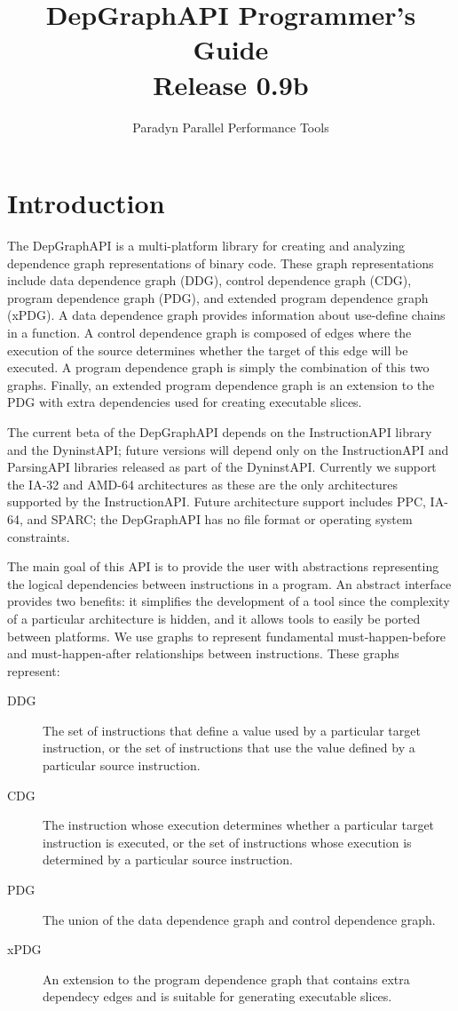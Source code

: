 \documentclass[12pt,titlepage]{article}
\begin{document}
\title{DepGraphAPI Programmer's Guide \\ Release 0.9b}
\author{Paradyn Parallel Performance Tools}
\maketitle
\tableofcontents
\section{Introduction}

The DepGraphAPI is a multi-platform library for creating and analyzing
dependence graph representations of binary code. These graph
representations include data dependence graph (DDG), control
dependence graph (CDG), program dependence graph (PDG), and extended program
dependence graph (xPDG). A data dependence graph provides information about
use-define chains in a function. A control dependence graph is composed of
edges where the execution of the source determines whether the target of this
edge will be executed. A program dependence graph is simply the
combination of this two graphs. Finally, an extended program dependence graph
is an extension to the PDG with extra dependencies used for creating executable
slices.

The current beta of the DepGraphAPI depends on the InstructionAPI library
and the DyninstAPI; future versions will depend only on the
InstructionAPI and ParsingAPI libraries released as part of the
DyninstAPI. Currently we support the IA-32 and AMD-64 architectures as
these are the only architectures supported by the
InstructionAPI. Future architecture support includes PPC, IA-64, and
SPARC; the DepGraphAPI has no file format or operating system
constraints.

The main goal of this API is to provide the user with abstractions
representing the logical dependencies between instructions in a
program. An abstract interface provides two benefits: it simplifies
the development of a tool since the complexity of a particular
architecture is hidden, and it allows tools to easily be ported
between platforms. We use graphs to represent fundamental
must-happen-before and must-happen-after relationships between
instructions. These graphs represent:
\begin{description}
\item[DDG] The set of instructions that define a value used by a
particular target instruction, or the set of instructions that use the
value defined by a particular source instruction.
\item[CDG] The instruction whose execution determines whether a
particular target instruction is executed, or the set of instructions
whose execution is determined by a particular source instruction.
\item[PDG] The union of the data dependence graph and control
dependence graph.
\item[xPDG] An extension to the program dependence graph that contains extra
dependecy edges and is suitable for generating executable slices.
\end{description}
\end{document}
